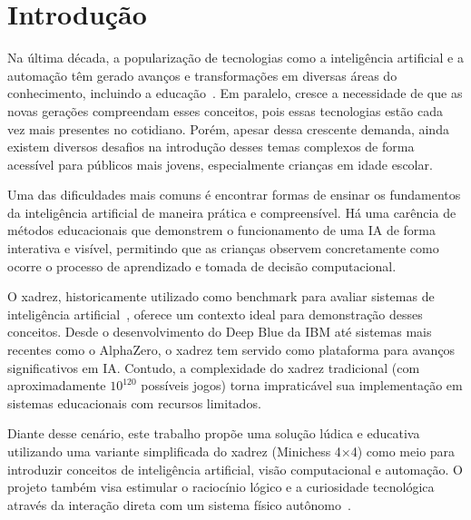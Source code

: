\documentclass[a4paper]{ifacconf}
\begin{document}


\section{Introdução}


\par\noindent Na última década, a popularização de tecnologias como a inteligência artificial e a automação têm gerado avanços e transformações em diversas áreas do conhecimento, incluindo a educação~\cite{tedre2021teaching}. Em paralelo, cresce a necessidade de que as novas gerações compreendam esses conceitos, pois essas tecnologias estão cada vez mais presentes no cotidiano. Porém, apesar dessa crescente demanda, ainda existem diversos desafios na introdução desses temas complexos de forma acessível para públicos mais jovens, especialmente crianças em idade escolar.

\par\noindent Uma das dificuldades mais comuns é encontrar formas de ensinar os fundamentos da inteligência artificial de maneira prática e compreensível. Há uma carência de métodos educacionais que demonstrem o funcionamento de uma IA de forma interativa e visível, permitindo que as crianças observem concretamente como ocorre o processo de aprendizado e tomada de decisão computacional.

\par\noindent O xadrez, historicamente utilizado como benchmark para avaliar sistemas de inteligência artificial~\cite{ensmenger2012chess}, oferece um contexto ideal para demonstração desses conceitos. Desde o desenvolvimento do Deep Blue da IBM até sistemas mais recentes como o AlphaZero, o xadrez tem servido como plataforma para avanços significativos em IA. Contudo, a complexidade do xadrez tradicional (com aproximadamente $10^{120}$ possíveis jogos) torna impraticável sua implementação em sistemas educacionais com recursos limitados.

\par\noindent Diante desse cenário, este trabalho propõe uma solução lúdica e educativa utilizando uma variante simplificada do xadrez (Minichess 4×4) como meio para introduzir conceitos de inteligência artificial, visão computacional e automação. O projeto também visa estimular o raciocínio lógico e a curiosidade tecnológica através da interação direta com um sistema físico autônomo~\cite{novak2021touching}.
\end{document}
